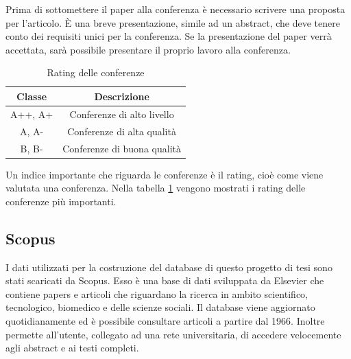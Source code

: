 Prima di sottomettere il paper alla conferenza è necessario scrivere una proposta per l’articolo. È una breve presentazione, simile ad un abstract, che 
deve tenere conto dei requisiti unici per la conferenza. Se la presentazione del paper verrà accettata, sarà possibile presentare il proprio lavoro alla 
conferenza. 

\begin{table}
    \centering
    \begin{tabular}{||c c ||} 
     \hline
     Classe & Descrizione \\ [0.5ex] 
     \hline\hline
     A++, A+ & Conferenze di alto livello \\ 
     \hline
     A, A- & Conferenze di alta qualità \\
     \hline
     B, B- & Conferenze di buona qualità \\ [1ex] 
     \hline
    \end{tabular}
    \caption{Rating delle conferenze}
    \label{table:ratings}
\end{table}

Un indice importante che riguarda le conferenze è il rating, cioè come viene valutata una conferenza. Nella tabella 
\ref{table:ratings} vengono mostrati i rating delle conferenze più importanti. 



\subsection{Scopus}
I dati utilizzati per la costruzione del database di questo progetto di tesi sono stati scaricati da Scopus. 
Esso è una base di dati sviluppata da Elsevier che contiene papers e articoli che riguardano la ricerca in ambito scientifico, 
tecnologico, biomedico e delle scienze sociali. 
Il database viene aggiornato quotidianamente ed è possibile consultare articoli a partire dal 1966. Inoltre permette all'utente, 
collegato ad una rete universitaria, di accedere velocemente agli abstract e ai testi completi.


